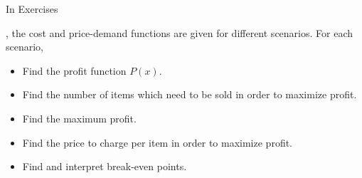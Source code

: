 {\noindent In Exercises}
{, the cost and price-demand functions are given for different scenarios.  For each scenario,


\begin{itemize}

\item  Find the profit function $P(x)$.

\item  Find the number of items which need to be sold in order to maximize profit.

\item  Find the maximum profit.

\item  Find the price to charge per item in order to maximize profit.

\item  Find and interpret break-even points.

\end{itemize}
}


